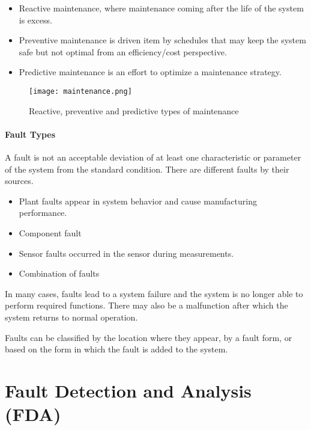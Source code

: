 \begin{itemize}
    \item Reactive maintenance, where maintenance coming after the life of
        the system is excess.
    \item Preventive maintenance is driven item by
        schedules that may keep the system safe but not optimal from an
        efficiency/cost perspective. 
    \item Predictive maintenance is an
        effort to optimize a maintenance strategy.
\end{itemize}

\begin{figure}[h!]
    \centering
    \texttt{[image: maintenance.png]}
    \caption{Reactive, preventive and predictive types of maintenance}
    \label{fig:maintenance}
\end{figure}


\paragraph{Fault Types} A fault is not an acceptable deviation of at least one
characteristic or parameter of the system from the standard condition.
There are different faults by their sources. 
\begin{itemize}
    \item Plant faults appear in system
        behavior and cause manufacturing performance.
    \item Component fault
    \item Sensor faults occurred in the sensor during measurements.
    \item Combination of faults
\end{itemize}
In many cases, faults lead to a system failure and
the system is no longer able to perform required functions.
There may also be a malfunction after which the system returns to normal
operation. 

Faults can be classified by the location where they appear, by a fault
form, or based on the form in which the fault is added to the system.


% 

\section{Fault Detection and Analysis (FDA)}

